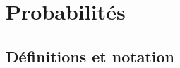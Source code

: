 \documentclass{BeamerTemplate}
\begin{document}
%
%
%
%
%
%

\section{Probabilités}

\subsection{Définitions et notation}
\end{document}
